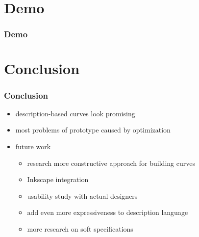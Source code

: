 \documentclass[mathserif]{beamer}
\begin{document}
	\section{Demo}


		\begin{frame}
			\frametitle{Demo}
		\end{frame}

	\section{Conclusion}

		\begin{frame}
			\frametitle{Conclusion}
			\begin{itemize}
				\item description-based curves look promising
				\item most problems of prototype caused by optimization
				\item future work
				\begin{itemize}
					\item research more constructive approach for building curves
					\item Inkscape integration
					\item usability study with actual designers
					\item add even more expressiveness to description language
					\item more research on soft specifications
				\end{itemize}
			\end{itemize}
		\end{frame}
\end{document}
